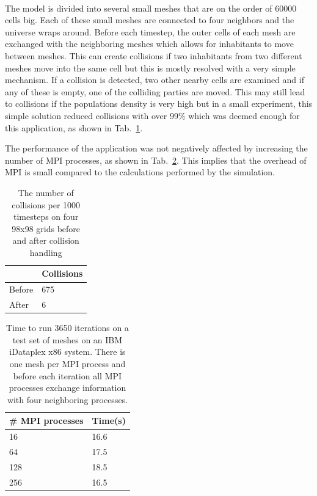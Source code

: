 \documentclass{report}
\begin{document}
\paragraph{}
The model is divided into several small meshes that are on the order of 60000 cells big. Each of these small meshes are connected to four neighbors and the universe wraps around. Before each timestep, the outer cells of each mesh are exchanged with the neighboring meshes which allows for inhabitants to move between meshes. This can create collisions if two inhabitants from two different meshes move into the same cell but this is mostly resolved with a very simple mechanism. If a collision is detected, two other nearby cells are examined and if any of these is empty, one of the colliding parties are moved. This may still lead to collisions if the populations density is very high but in a small experiment, this simple solution reduced collisions with over 99\% which was deemed enough for this application, as shown in Tab.~\ref{collisions}.

The performance of the application was not negatively affected by increasing the  number of MPI processes, as shown in Tab.~\ref{mpiperformance}. This implies that the overhead of MPI is small compared to the calculations performed by the simulation.

\begin{table}
\centering
\begin{tabular}{|l|l|}
\hline
& Collisions\\
\hline
Before & 675\\
\hline
After & 6\\
\hline
\end{tabular}
\caption{The number of collisions per 1000 timesteps on four 98x98 grids before and after collision handling}
\label{collisions}
\end{table}

\begin{table}
\centering
\begin{tabular}{|l|l|}
\hline
\# MPI processes& Time(s) \\
\hline
16 & 16.6\\
\hline
64 & 17.5\\
\hline
128 & 18.5\\
\hline
256 & 16.5\\
\hline
\end{tabular}
\caption{Time to run 3650 iterations on a test set of meshes on an IBM iDataplex x86 system. There is one mesh per MPI process and before each iteration all MPI processes exchange information with four neighboring processes.}
\label{mpiperformance}
\end{table}
\end{document}
